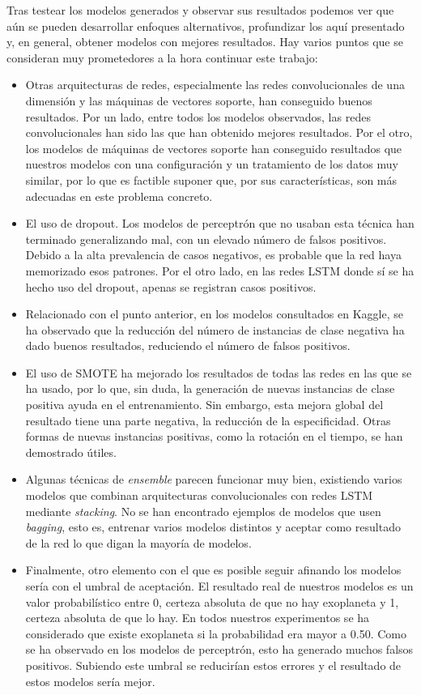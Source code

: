 Tras testear los modelos generados y observar sus resultados podemos ver que aún se pueden desarrollar enfoques alternativos, profundizar los aquí presentado y, en general, obtener modelos con mejores resultados. Hay varios puntos que se consideran muy prometedores a la hora continuar este trabajo:

\begin{itemize}
    \item Otras arquitecturas de redes, especialmente las redes convolucionales de una dimensión y las máquinas de vectores soporte, han conseguido buenos resultados. Por un lado, entre todos los modelos observados, las redes convolucionales han sido las que han obtenido mejores resultados. Por el otro, los modelos de máquinas de vectores soporte han conseguido resultados que nuestros modelos con una configuración y un tratamiento de los datos muy similar, por lo que es factible suponer que, por sus características, son más adecuadas en este problema concreto. 
    \item El uso de dropout. Los modelos de perceptrón que no usaban esta técnica han terminado generalizando mal, con un elevado número de falsos positivos. Debido a la alta prevalencia de casos negativos, es probable que la red haya memorizado esos patrones. Por el otro lado, en las redes LSTM donde sí se ha hecho uso del dropout, apenas se registran casos positivos.
    \item Relacionado con el punto anterior, en los modelos consultados en Kaggle, se ha observado que la reducción del número de instancias de clase negativa ha dado buenos resultados, reduciendo el número de falsos positivos.
    \item El uso de SMOTE ha mejorado los resultados de todas las redes en las que se ha usado, por lo que, sin duda, la generación de nuevas instancias de clase positiva ayuda en el entrenamiento. Sin embargo, esta mejora global del resultado tiene una parte negativa, la reducción de la especificidad. Otras formas de nuevas instancias positivas, como la rotación en el tiempo, se han demostrado útiles.
    \item Algunas técnicas de \textit{ensemble} parecen funcionar muy bien, existiendo varios modelos que combinan arquitecturas convolucionales con redes LSTM mediante \textit{stacking}. No se han encontrado ejemplos de modelos que usen \textit{bagging}, esto es, entrenar varios modelos distintos y aceptar como resultado de la red lo que digan la mayoría de modelos.
    \item Finalmente, otro elemento con el que es posible seguir afinando los modelos sería con el umbral de aceptación. El resultado real de nuestros modelos es un valor probabilístico entre 0, certeza absoluta de que no hay exoplaneta y 1, certeza absoluta de que lo hay. En todos nuestros experimentos se ha considerado que existe exoplaneta si la probabilidad era mayor a 0.50. Como se ha observado en los modelos de perceptrón, esto ha generado muchos falsos positivos. Subiendo este umbral se reducirían estos errores y el resultado de estos modelos sería mejor.
\end{itemize}